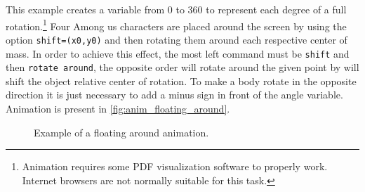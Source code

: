 \documentclass[12pt]{article}
\begin{document}
This example creates a variable from 0 to 360 to represent each degree of a full rotation.\footnote{Animation requires some PDF visualization software to properly work. Internet browsers are not normally suitable for this task.} Four Among us characters are placed around the screen by using the option \texttt{shift={(x0,y0)}} and then rotating them around each respective center of mass. In order to achieve this effect, the most left command must be \texttt{shift} and then \texttt{rotate around}, the opposite order will rotate around the given point by will shift the object relative center of rotation. To make a body rotate in the opposite direction it is just necessary to add a minus sign in front of the angle variable. Animation is present in \autoref{fig:anim_floating_around}.
\begin{FHZtcbAmongUs}
\begin{animateinline}{30}
\end{animateinline}
\end{FHZtcbAmongUs}


\begin{figure}[ht!]
  \begin{animateinline}{30}
  \end{animateinline}
  \caption{Example of a floating around animation.}
  \label{fig:anim_floating_around}
\end{figure}
\end{document}
